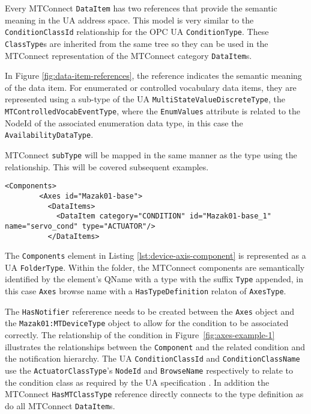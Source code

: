 Every MTConnect \texttt{Data\-Item} has two references that provide the semantic meaning in the UA address space. This model is very similar to the \texttt{Condition\-Class\-Id} relationship for the OPC UA \texttt{Condition\-Type}. These \texttt{Class\-Type}s are inherited from the same tree so they can be used in the MTConnect representation of the MTConnect  category \texttt{Data\-Item}s.



In Figure \ref{fig:data-item-references}, the  reference indicates the semantic meaning of the data item. For enumerated or controlled vocabulary data items, they are represented using a sub-type of the UA \texttt{Multi\-State\-Value\-Discrete\-Type}, the \texttt{MTControlled\-Vocab\-Event\-Type}, where the \texttt{Enum\-Values} attribute is related to the NodeId of the associated enumeration data type, in this case the \texttt{Availability\-Data\-Type}.

MTConnect \texttt{subType} will be mapped in the same manner as the type using the  relationship. This will be covered subsequent examples.

\begin{lstlisting}[firstnumber=last,%
    caption={Components and Conditions},label={lst:device-axis-component}]
      <Components>
        <Axes id="Mazak01-base">
          <DataItems>
            <DataItem category="CONDITION" id="Mazak01-base_1" name="servo_cond" type="ACTUATOR"/>
          </DataItems>
\end{lstlisting}

The \texttt{Components} element in Listing \ref{lst:device-axis-component} is represented as a UA \texttt{Folder\-Type}. Within the folder, the MTConnect components are semantically identified by the element's QName with a type with the suffix \texttt{Type} appended, in this case \texttt{Axes} browse name with a \texttt{HasTypeDefinition} relaton of \texttt{AxesType}. 



The \texttt{HasNotifier} refererence needs to be created between the \texttt{Axes} object and the \texttt{Mazak01\-:\-MTDeviceType} object to allow for the condition to be associated correctly. The relationship of the condition in Figure~\ref{fig:axes-example-1} illustrates the relationships between the \texttt{Component} and the related condition and the notification hierarchy. The UA \texttt{Condition\-ClassId} and \texttt{Condition\-ClassName} use the \texttt{Actuator\-ClassType}'s \texttt{NodeId} and \texttt{BrowseName} respectively to relate to the condition class as required by the UA specification \cite{UAPart9}. In addition the MTConnect \texttt{HasMTClassType} reference directly connects to the type definition as do all MTConnect \texttt{DataItem}s.


